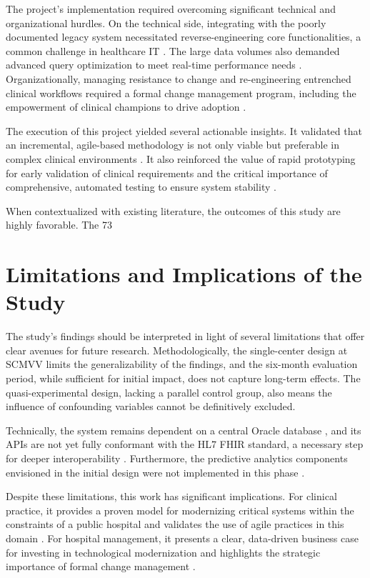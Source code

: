 The project's implementation required overcoming significant technical and organizational hurdles. On the technical side, integrating with the poorly documented legacy system necessitated reverse-engineering core functionalities, a common challenge in healthcare IT \cite{keasberry2017}. The large data volumes also demanded advanced query optimization to meet real-time performance needs \cite{jiang2014}. Organizationally, managing resistance to change and re-engineering entrenched clinical workflows required a formal change management program, including the empowerment of clinical champions to drive adoption \cite{rogers2003}.

The execution of this project yielded several actionable insights. It validated that an incremental, agile-based methodology is not only viable but preferable in complex clinical environments \cite{may2013}. It also reinforced the value of rapid prototyping for early validation of clinical requirements and the critical importance of comprehensive, automated testing to ensure system stability \cite{fowler2018}.

When contextualized with existing literature, the outcomes of this study are highly favorable. The 73%

\section{Limitations and Implications of the Study}

The study's findings should be interpreted in light of several limitations that offer clear avenues for future research. Methodologically, the single-center design at SCMVV limits the generalizability of the findings, and the six-month evaluation period, while sufficient for initial impact, does not capture long-term effects. The quasi-experimental design, lacking a parallel control group, also means the influence of confounding variables cannot be definitively excluded.

Technically, the system remains dependent on a central Oracle database \cite{lin2018}, and its APIs are not yet fully conformant with the HL7 FHIR standard, a necessary step for deeper interoperability \cite{mandl2020}. Furthermore, the predictive analytics components envisioned in the initial design were not implemented in this phase \cite{bates2021}.

Despite these limitations, this work has significant implications. For clinical practice, it provides a proven model for modernizing critical systems within the constraints of a public hospital and validates the use of agile practices in this domain \cite{vaghasiya2021}. For hospital management, it presents a clear, data-driven business case for investing in technological modernization and highlights the strategic importance of formal change management \cite{donabedian1988}. 